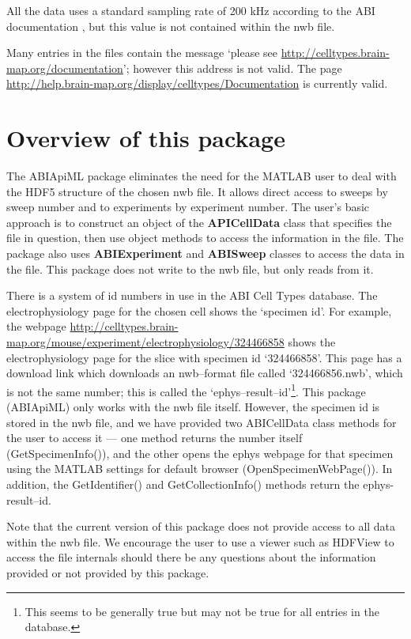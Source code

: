 \documentclass{article}
\begin{document}
All the data uses a standard sampling rate of 200 kHz according to the ABI documentation \citep{ABI2015a}, but this value is not contained within the nwb file.

Many entries in the files contain the message `please see \url{http://celltypes.brain-map.org/documentation}'; however this address is not valid.  The page \url{http://help.brain-map.org/display/celltypes/Documentation} is currently valid.

\section{Overview of this package}
The ABIApiML package eliminates the need for the MATLAB user to deal with the HDF5 structure of the chosen nwb file.  It allows direct access to sweeps by sweep number and to experiments by experiment number.  The user's basic approach is to construct an object of the \textbf{APICellData} class that specifies the file in question, then use object methods to access the information in the file. The package also uses \textbf{ABIExperiment} and \textbf{ABISweep} classes to access the data in the file.   This package does not write to the nwb file, but only reads from it.

There is a system of id numbers in use in the ABI Cell Types database.  The electrophysiology page for the chosen cell shows the `specimen id'. For example, the webpage \url{http://celltypes.brain-map.org/mouse/experiment/electrophysiology/324466858} shows the electrophysiology page for the slice with specimen id `324466858'.  This page has a download link which downloads an nwb--format file called `324466856.nwb', which is not the same number; this is called the `ephys--result--id'\footnote{This seems to be generally true but may not be true for all entries in the database.}.  This package (ABIApiML) only works with the nwb file itself. However, the specimen id is stored in the nwb file, and we have provided two ABICellData class methods for the user to access it --- one method returns the number itself (GetSpecimenInfo()), and the other opens the ephys webpage for that specimen using the MATLAB settings for default browser (OpenSpecimenWebPage()).  In addition, the GetIdentifier() and GetCollectionInfo() methods return the ephys-result--id.

Note that the current version of this package does not provide access to all data within the nwb file.  We encourage the user to use a viewer such as HDFView to access the file internals should there be any questions about the information provided or not provided by this package.
\end{document}
